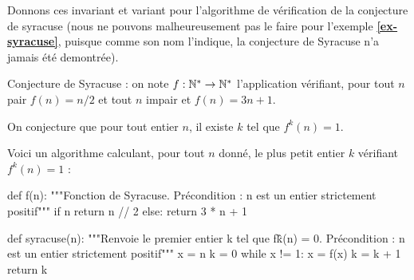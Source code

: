 \question{} Donnons ces invariant et variant pour l'algorithme de vérification de la conjecture de syracuse (nous ne 
pouvons malheureusement pas le faire pour l'exemple \textbf{\ref{ex-syracuse}}, puisque comme son 
nom l'indique, la conjecture de Syracuse n'a jamais été demontrée). 

Conjecture de Syracuse : on note $f : \mathbb{N}^{*} \to \mathbb{N}^{*}$ l'application vérifiant, pour tout $n$ pair
$f(n)=n/2$ et tout $n$ impair et $f(n)=3n+1$.

On conjecture que pour tout entier $n$, il existe $k$ tel que
$f^{k}(n)=1$.

Voici un algorithme calculant, pour tout $n$ donné, le plus petit
entier $k$ vérifiant $f^{k}(n) = 1$ :

\begin{pyverbatim}
def f(n):
    """Fonction de Syracuse.
    Précondition : n est un entier strictement positif"""
    if n %
        return n // 2
    else:
        return 3 * n + 1
\end{pyverbatim}

\begin{pyverbatim}        
def syracuse(n):
    """Renvoie le premier entier k tel que  f\^k(n) = 0.
    Précondition : n est un entier strictement positif"""
    x = n
    k = 0
    while x != 1:
        x = f(x)
        k = k + 1
    return k
\end{pyverbatim}

